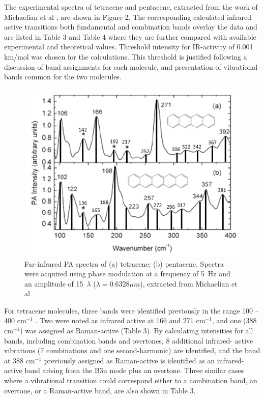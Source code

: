 The experimental spectra of tetracene and pentacene, extracted from the work of Michaelian et al \cite{michaelian2012far} , are shown in Figure 2. The corresponding calculated infrared active transitions both fundamental and combination bands overlay the data and are listed in Table 3 and Table 4 where they are further compared with available experimental and theoretical values. Threshold intensity for IR-activity of 0.001 km/mol was chosen for the calculations. This threshold is justified following a discussion of band assignments for each molecule, and presentation of vibrational bands common for the two molecules.

\begin{figure}[h]
	\centering
	\includegraphics[scale=0.8]{image/spectra-TP}
	\caption[Far-infrared PA spectra of (a) tetracene; (b) pentacene]{Far-infrared PA spectra of (a) tetracene; (b) pentacene. Spectra were acquired using phase modulation at a frequency of 5 Hz and an amplitude of 15 $\lambda$ ($\lambda = 0.6328 \mu m$), extracted from Michaelian et al \cite{michaelian2012far} } \label{spectra-TP}
\end{figure}

For tetracene molecules, three bands were identified previously in the range 100 – 400 cm$^{-1}$ \cite{michaelian2012far,malloci2007time}. Two were noted as infrared active at 166 and 271 cm$^{-1}$, and one (388 cm$^{-1}$) was assigned as Raman-active (Table 3). By calculating intensities for all bands, including combination bands and overtones, 8 additional infrared- active vibrations (7 combinations and one second-harmonic) are identified, and the band at 388 cm$^{-1}$ previously assigned as Raman-active is identified as an infrared-active band arising from the B3u mode plus an overtone. Three similar cases where a vibrational transition could correspond either to a  combination band, an overtone, or a Raman-active band, are also shown in Table 3.

